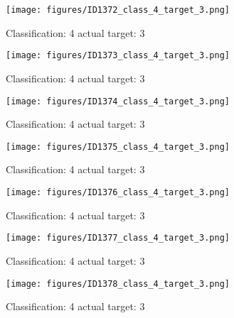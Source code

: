 \begin{figure}[h!]
\begin{center}
\texttt{[image: figures/ID1372\_class\_4\_target\_3.png]}
\end{center}
\caption{ Classification: 4 actual target: 3}
\label{fig:ID1372_class_4_target_3}
\end{figure}
\begin{figure}[h!]
\begin{center}
\texttt{[image: figures/ID1373\_class\_4\_target\_3.png]}
\end{center}
\caption{ Classification: 4 actual target: 3}
\label{fig:ID1373_class_4_target_3}
\end{figure}
\begin{figure}[h!]
\begin{center}
\texttt{[image: figures/ID1374\_class\_4\_target\_3.png]}
\end{center}
\caption{ Classification: 4 actual target: 3}
\label{fig:ID1374_class_4_target_3}
\end{figure}
\begin{figure}[h!]
\begin{center}
\texttt{[image: figures/ID1375\_class\_4\_target\_3.png]}
\end{center}
\caption{ Classification: 4 actual target: 3}
\label{fig:ID1375_class_4_target_3}
\end{figure}
\begin{figure}[h!]
\begin{center}
\texttt{[image: figures/ID1376\_class\_4\_target\_3.png]}
\end{center}
\caption{ Classification: 4 actual target: 3}
\label{fig:ID1376_class_4_target_3}
\end{figure}
\begin{figure}[h!]
\begin{center}
\texttt{[image: figures/ID1377\_class\_4\_target\_3.png]}
\end{center}
\caption{ Classification: 4 actual target: 3}
\label{fig:ID1377_class_4_target_3}
\end{figure}
\begin{figure}[h!]
\begin{center}
\texttt{[image: figures/ID1378\_class\_4\_target\_3.png]}
\end{center}
\caption{ Classification: 4 actual target: 3}
\label{fig:ID1378_class_4_target_3}
\end{figure}
